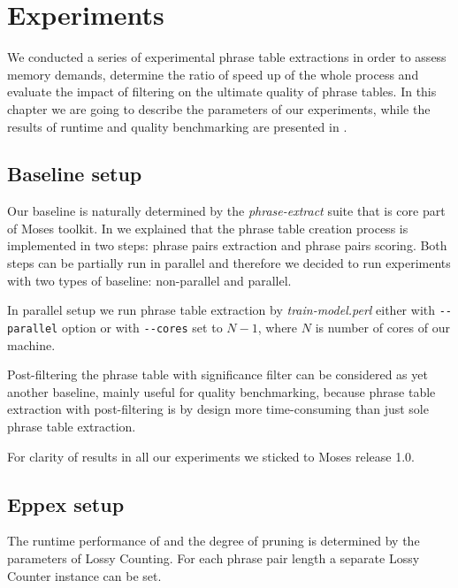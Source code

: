 \chapter{Experiments}
\label{chap:experiments}

We conducted a series of experimental phrase table extractions in order to
assess \eppex{} memory demands, determine the ratio of speed up of the whole
process and evaluate the impact of filtering on the ultimate quality of phrase
tables.
In this chapter we are going to describe the parameters of our experiments,
while the results of runtime and quality benchmarking are presented in
.

\section{Baseline setup}

Our baseline is naturally determined by the \emph{phrase-extract} suite that
is core part of Moses toolkit.
In  we explained that the phrase table creation process
is implemented in two steps: phrase pairs extraction and phrase pairs scoring.
Both steps can be partially run in parallel and therefore we decided to run
experiments with two types of baseline: non-parallel and parallel.

In parallel setup we run phrase table extraction by \emph{train-model.perl}
either with \verb|--parallel| option or with \verb|--cores| set to $N-1$,
where $N$ is number of cores of our machine.

Post-filtering the phrase table with significance filter can be considered as
yet another baseline, mainly useful for quality benchmarking, because
phrase table extraction with post-filtering is by design more time-consuming
than just sole phrase table extraction.

For clarity of results in all our experiments we sticked to Moses release 1.0.

\section{Eppex setup}

The runtime performance of \eppex{} and the degree of pruning is determined
by the parameters of Lossy Counting.
For each phrase pair length a separate Lossy Counter instance can be set.

